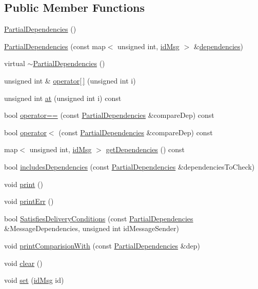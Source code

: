 \subsection*{Public Member Functions}
\begin{DoxyCompactItemize}
\item 
\hyperlink{classPartialDependencies_aefb05dec194a9ab63482df6645cbd842}{Partial\+Dependencies} ()
\item 
\hyperlink{classPartialDependencies_a1f17aad6d01c7e8cdc40bf99138eb528}{Partial\+Dependencies} (const map$<$ unsigned int, \hyperlink{structures_8h_a83a1d9a070efa5341da84cfd8e28d3e5}{id\+Msg} $>$ \&\hyperlink{classPartialDependencies_a4b72531ce3a3b7c4b6f02d0fe8ea1a7c}{dependencies})
\item 
virtual \hyperlink{classPartialDependencies_a8fa3da23d89db5b71b42e234617755f7}{$\sim$\+Partial\+Dependencies} ()
\item 
unsigned int \& \hyperlink{classPartialDependencies_afafbc86f0bc7c649bcfbddbb90125e8f}{operator\mbox{[}$\,$\mbox{]}} (unsigned int i)
\item 
unsigned int \hyperlink{classPartialDependencies_ac0a0d04664f3a953596ca26224f5ed7d}{at} (unsigned int i) const
\item 
bool \hyperlink{classPartialDependencies_a432719e4e5fdcd9cdb0d3a5ce2a5c8af}{operator==} (const \hyperlink{classPartialDependencies}{Partial\+Dependencies} \&compare\+Dep) const
\item 
bool \hyperlink{classPartialDependencies_af8f87bc4a622db0f56276502c6655f38}{operator$<$} (const \hyperlink{classPartialDependencies}{Partial\+Dependencies} \&compare\+Dep) const
\item 
map$<$ unsigned int, \hyperlink{structures_8h_a83a1d9a070efa5341da84cfd8e28d3e5}{id\+Msg} $>$ \hyperlink{classPartialDependencies_a816f0a770b1d6f3255a1485705e262d2}{get\+Dependencies} () const
\item 
bool \hyperlink{classPartialDependencies_a4cfd27959669b5b7b58ea07d38824d7b}{includes\+Dependencies} (const \hyperlink{classPartialDependencies}{Partial\+Dependencies} \&dependencies\+To\+Check)
\item 
void \hyperlink{classPartialDependencies_a9a9346473ba5de6a1bdffb44145f8fca}{print} ()
\item 
void \hyperlink{classPartialDependencies_ac4c98e7d381b9e9efa54a094d1da729d}{print\+Err} ()
\item 
bool \hyperlink{classPartialDependencies_a67a733dba9069541f83fecee520ccce1}{Satisfies\+Delivery\+Conditions} (const \hyperlink{classPartialDependencies}{Partial\+Dependencies} \&Message\+Dependencies, unsigned int id\+Message\+Sender)
\item 
void \hyperlink{classPartialDependencies_ad6e8fb1bff79b43dab24727b3511caf0}{print\+Comparision\+With} (const \hyperlink{classPartialDependencies}{Partial\+Dependencies} \&dep)
\item 
void \hyperlink{classPartialDependencies_a6543f75ad3391ee5d0cb0614ca97b9c0}{clear} ()
\item 
void \hyperlink{classPartialDependencies_ad60f5e87d6d7e027c399bd1a8206a952}{set} (\hyperlink{structures_8h_a83a1d9a070efa5341da84cfd8e28d3e5}{id\+Msg} id)
\end{DoxyCompactItemize}
